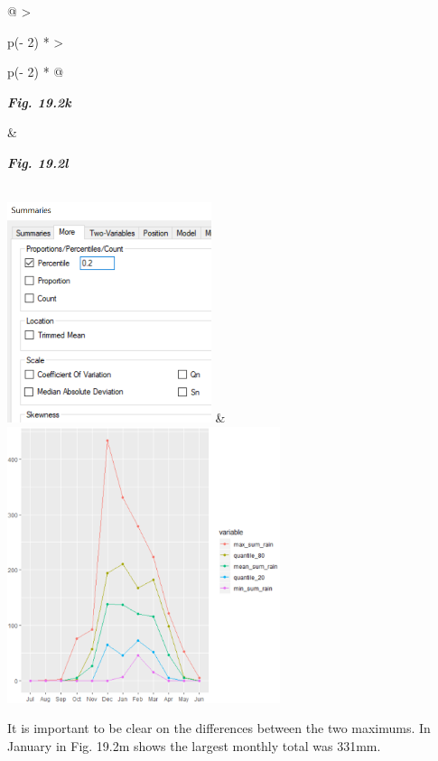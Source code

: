 \documentclass[
  letterpaper,
  DIV=11,
  numbers=noendperiod]{scrreprt}
\begin{document}
\begin{longtable}[]{@{}
  >{\raggedright\arraybackslash}p{(\columnwidth - 2\tabcolsep) * }
  >{\raggedright\arraybackslash}p{(\columnwidth - 2\tabcolsep) * }@{}}
\toprule\noalign{}
\begin{minipage}[b]{\linewidth}\raggedright
\textbf{\emph{Fig. 19.2k}}
\end{minipage} & \begin{minipage}[b]{\linewidth}\raggedright
\textbf{\emph{Fig. 19.2l}}
\end{minipage} \\
\midrule\noalign{}
\endhead
\bottomrule\noalign{}
\endlastfoot
\includegraphics[width=2.35191in,height=2.54007in]{figures/Fig19.2k.png}
&
\includegraphics[width=3.14897in,height=3.18948in]{figures/Fig19.2l.png} \\
\end{longtable}

It is important to be clear on the differences between the two maximums.
In January in Fig. 19.2m shows the largest monthly total was 331mm.
\end{document}
